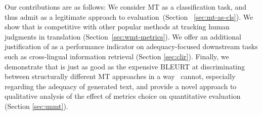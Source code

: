 


Our contributions are as follows:
We consider MT as a classification task, and thus admit  as a legitimate approach to evaluation~(Section ~\ref{sec:mt-as-cls}). 
We show that  is competitive with other popular methods at tracking human judgments in translation (Section~\ref{sec:wmt-metrics}). 
We offer an additional justification of  as a performance indicator on adequacy-focused downstream tasks such as cross-lingual information retrieval (Section \ref{sec:clir}). 
Finally, we demonstrate that  is just as good as the expensive BLEURT at discriminating between structurally different MT approaches in a way \bleu\ cannot, especially regarding the adequacy of generated text, and provide a novel approach to qualitative analysis of the effect of metrics choice on quantitative evaluation (Section \ref{sec:unmt}).

